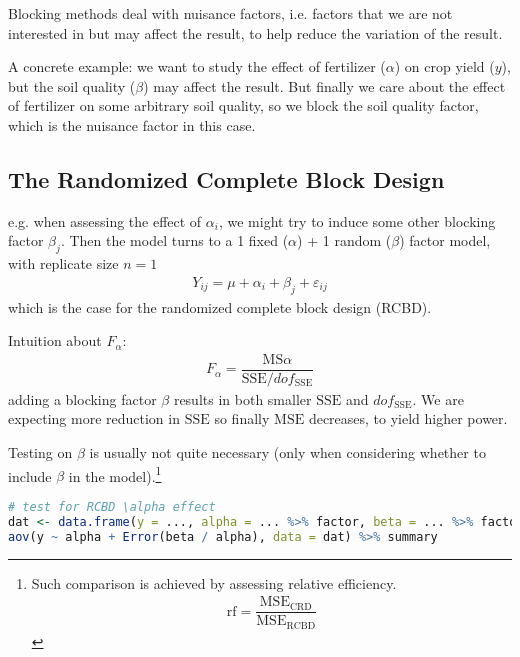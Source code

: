 Blocking methods deal with nuisance factors, i.e. factors that we are not interested in but may affect the result, to help reduce the variation of the result. 

A concrete example: we want to study the effect of fertilizer ($ \alpha  $) on crop yield ($ y $), but the soil quality ($ \beta  $) may affect the result. But finally we care about the effect of fertilizer on some arbitrary soil quality, so we block the soil quality factor, which is the nuisance factor in this case.


\subsection{The Randomized Complete Block Design}
e.g. when assessing the effect of $ \alpha _i $, we might try to induce some other blocking factor $ \beta _j $. Then the model turns to a 1 fixed ($ \alpha  $) + 1 random ($ \beta  $) factor model, with replicate size $ n=1 $
\begin{align}
    Y_{ij}=\mu +\alpha _i+\beta _j +\varepsilon _{ij}
\end{align}
which is the case for the randomized complete block design (RCBD).

Intuition about $ F_\alpha  $:
\begin{align}
    F_\alpha = \dfrac{ \mathrm{ MS}\alpha   }{ \mathrm{ SSE }/dof_\mathrm{ SSE }  }
\end{align}
adding a blocking factor $ \beta  $ results in both smaller $ \mathrm{SSE}   $ and $ dof_\mathrm{ SSE }  $. We are expecting more reduction in $ \mathrm{SSE} $ so finally $ \mathrm{ MSE }  $ decreases, to yield higher power. 

Testing on $ \beta  $ is usually not quite necessary (only when considering whether to include $ \beta  $ in the model).\footnote{Such comparison is achieved by assessing relative efficiency.
\begin{align*}
    \mathrm{ rf }=\dfrac{ \mathrm{MSE}_\mathrm{ CRD }    }{ \mathrm{ MSE }_\mathrm{ RCBD } }   
\end{align*}
}

\begin{rcode}
\begin{lstlisting}[language=R]
# test for RCBD \alpha effect 
dat <- data.frame(y = ..., alpha = ... %>% factor, beta = ... %>% factor)
aov(y ~ alpha + Error(beta / alpha), data = dat) %>% summary
\end{lstlisting}
\end{rcode}


